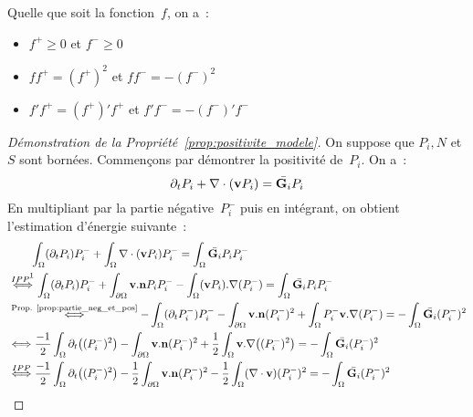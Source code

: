 \documentclass[main.tex]{subfiles}
\begin{document}
\begin{prop}\label{prop:partie_neg_et_pos}
Quelle que soit la fonction~$f$, on a~:
\begin{itemize}
\item $f^+ \geq 0$ et $f^- \geq 0$
\item $ff^+=(f^+)^2$  et $ff^-=-(f^-)^2$ 
\item  $f'f^+=(f^+)'f^+$  et $f'f^-=-(f^-)'f^-$ 
\end{itemize} 
\end{prop}

\begin{proof}[Démonstration de la Propriété~\ref{prop:positivite_modele}]
On suppose que $P_i,N$ et $S$ sont bornées. Commençons par démontrer la positivité de~$P_i$. On a~:
$$\partial_t P_i + \dive (\vit P_i) = \bar{\GG_i}P_i $$
En multipliant par la partie négative~$P_i^-$ puis en intégrant, on obtient l'estimation d'énergie suivante~:
$$
\begin{aligned}
&\qquad \intx (\partial_t P_i) P_i^- + \intx \dive (\vit P_i) P_i^- = \intx \bar{\GG_i} P_i P_i^- \\
&\overset{IPP\protect\footnotemark}{\Longleftrightarrow} \intx (\partial_t P_i) P_i^- + \intbord \vit . \nn P_i P_i^- - \intx (\vit P_i).\nabla (P_i^-)  = \intx \bar{\GG_i} P_i P_i^-  \\
&\overset{\textrm{Prop. \ref{prop:partie_neg_et_pos}}}{\Longleftrightarrow}  - \intx (\partial_t P_i^-) P_i^- - \intbord \vit . \nn (P_i^-)^2 + \intx P_i^- \vit.\nabla (P_i^-)  = - \intx \bar{\GG_i} (P_i^-)^2  \\
&\Longleftrightarrow  \frac{-1}{2} \intx \partial_t \big( (P_i^-)^2 \big) - \intbord \vit . \nn (P_i^-)^2 + \frac{1}{2} \intx \vit.\nabla \big( (P_i^-)^2\big)   = - \intx \bar{\GG_i} (P_i^-)^2  \\
&\overset{IPP}{\Longleftrightarrow}  \frac{-1}{2} \intx \partial_t \big( (P_i^-)^2 \big) -\frac{1}{2} \intbord \vit . \nn (P_i^-)^2 - \frac{1}{2} \intx (\dive \vit)  (P_i^-)^2  = - \intx \bar{\GG_i} (P_i^-)^2  \\

\end{aligned}$$
\end{proof}
\end{document}

